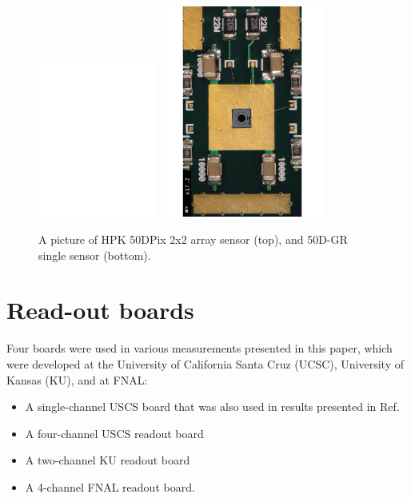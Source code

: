 \documentclass[preprint,1p]{elsarticle}
\begin{document}
\begin{figure}[htbp] 
\centering
\includegraphics[width=0.35\textwidth, angle=270]{figs/HPK-50DPix.pdf} 
\includegraphics[width=0.48\textwidth, angle=90]{figs/HPK-50D.pdf} 
\caption{A picture of HPK 50DPix 2x2 array sensor (top), and 50D-GR single sensor (bottom).} 
\label{fig:Sensors} 
\end{figure} 


\section{Read-out boards}

Four boards were used in various measurements presented in this paper, which
were developed at the University of California Santa Cruz (UCSC), University of
Kansas (KU), and at FNAL:

\begin{itemize}
  \item A single-channel USCS board that
was also used in results presented in Ref.~\cite{Cartiglia201783}
\item A four-channel USCS readout board
\item A two-channel KU readout board
\item A 4-channel FNAL readout board.
\end{itemize}
\end{document}
